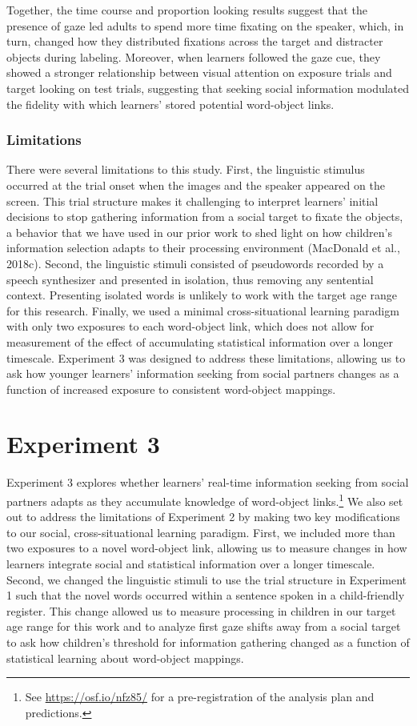 \documentclass[oneside]{report}
\begin{document}
Together, the time course and proportion looking results suggest that
the presence of gaze led adults to spend more time fixating on the
speaker, which, in turn, changed how they distributed fixations across
the target and distracter objects during labeling. Moreover, when
learners followed the gaze cue, they showed a stronger relationship
between visual attention on exposure trials and target looking on test
trials, suggesting that seeking social information modulated the
fidelity with which learners' stored potential word-object links.

\subsubsection{Limitations}\label{limitations-1}

There were several limitations to this study. First, the linguistic
stimulus occurred at the trial onset when the images and the speaker
appeared on the screen. This trial structure makes it challenging to
interpret learners' initial decisions to stop gathering information from
a social target to fixate the objects, a behavior that we have used in
our prior work to shed light on how children's information selection
adapts to their processing environment (MacDonald et al., 2018c).
Second, the linguistic stimuli consisted of pseudowords recorded by a
speech synthesizer and presented in isolation, thus removing any
sentential context. Presenting isolated words is unlikely to work with
the target age range for this research. Finally, we used a minimal
cross-situational learning paradigm with only two exposures to each
word-object link, which does not allow for measurement of the effect of
accumulating statistical information over a longer timescale. Experiment
3 was designed to address these limitations, allowing us to ask how
younger learners' information seeking from social partners changes as a
function of increased exposure to consistent word-object mappings.

\section{Experiment 3}\label{experiment-3-1}

Experiment 3 explores whether learners' real-time information seeking
from social partners adapts as they accumulate knowledge of word-object
links.\footnote{See \url{https://osf.io/nfz85/} for a pre-registration
  of the analysis plan and predictions.} We also set out to address the
limitations of Experiment 2 by making two key modifications to our
social, cross-situational learning paradigm. First, we included more
than two exposures to a novel word-object link, allowing us to measure
changes in how learners integrate social and statistical information
over a longer timescale. Second, we changed the linguistic stimuli to
use the trial structure in Experiment 1 such that the novel words
occurred within a sentence spoken in a child-friendly register. This
change allowed us to measure processing in children in our target age
range for this work and to analyze first gaze shifts away from a social
target to ask how children's threshold for information gathering changed
as a function of statistical learning about word-object mappings.
\end{document}
